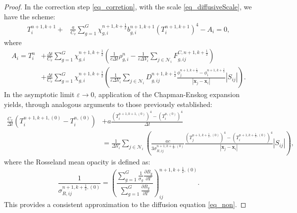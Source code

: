 \documentclass[preprint,12pt]{elsarticle}
\theoremstyle{definition}
\theoremstyle{plain}
\numberwithin{equation}{section}
\numberwithin{algorithm}{section}
\newcounter{eq_count}
\newcounter{tab_count}
\newcommand{\half}{\frac{1}{2}}
\newcommand{\vr}{\mathbf{x}}
\newcommand{\pdrv}[2]{\frac{\partial{#1}}{\partial{#2}}}
\begin{document}
\begin{proof}
In the correction step \eqref{eq_corretion}, with the scale \eqref{eq_diffusiveScale}, we have the scheme:
\begin{equation}
	\begin{aligned}
		T_i^{n+1,k+1} +& \frac{ a}{C_v} \sum_{g=1}^G \chi_{g,i}^{n+1, k+ \half}  b_{g,i}^{n+1, k+1} (T_i^{n+1,k+1})^4 -A_i =0,
	\end{aligned}
\end{equation}
where 
\begin{equation*}
	\begin{aligned}
		A_i  = T_i^n &+ \frac{\Delta t}{C_v} \sum_{g=1}^G \chi_{g,i}^{n+1, k+ \half}\left( \frac{1}{c \Delta t} \rho_{g,i}^n- \frac{1}{\varepsilon \Delta V_i}  \sum_{j \in \mathcal{N}_i} 
		 F_{g,ij}^{C,n+1,k+\half} \right)
		\\
		&+\frac{\Delta t}{C_v} \sum_{g=1}^G \chi_{g,i}^{n+1, k+ \half}\left( \frac{1}{\varepsilon \Delta V_i}  \sum_{j \in \mathcal{N}_i} 
		D_{g,ij}^{n+1,k+\half}\frac{\phi_{j}^{n+1,k+\half} - \phi_i^{n+1,k+\half}}{ |\vr_j - \vr_i| }|S_{ij}|\right).
	\end{aligned}
\end{equation*}
In the asymptotic limit  $\varepsilon \rightarrow 0$, application of the Chapman-Enskog expansion yields, through analogous arguments to those previously established:
    \begin{equation} \label{eq_nonLinear}
    	\begin{aligned}
    		\frac{C_v}{ \Delta t} (T_i^{n+1,k+1,(0)} - T_i^{n,(0)})
    		&+  a \frac{\left(T_i^{n+1,k+1,(0)}\right)^4 - \left(T_i^{n,(0)}\right)^4  }{\Delta t}
    		\\
    		&=    \frac{1}{ \Delta  V_i } \sum_{j \in \mathcal{N}_i}  \left( \frac{ac }{3\sigma_{R,ij}^{n+1,k+\half,(0)}}  \frac{\left(T_j^{n+1,k+\frac{1}{2},(0)}\right)^4 - \left(T_i^{n+1,k+\frac{1}{2},(0)}\right)^4 }{ |\vr_j - \vr_i| }|S_{ij}|    \right),
    	\end{aligned}
    \end{equation}
    where the Rosseland mean opacity is defined as:
    \begin{equation*}
    	\frac{1}{\sigma_{R,ij}^{n+1,k+\half,(0)}}= \left( \frac{\sum_{g=1}^{G} \frac{1}{\sigma_g} \pdrv{B_g}{T} }{\sum_{g=1}^{G} \pdrv{B_g}{T} } \right)^{n+1,k+\half,(0)}_{ij}.
    \end{equation*}
   This provides a consistent approximation to the diffusion equation \eqref{eq_non}.
\end{proof}
\end{document}

